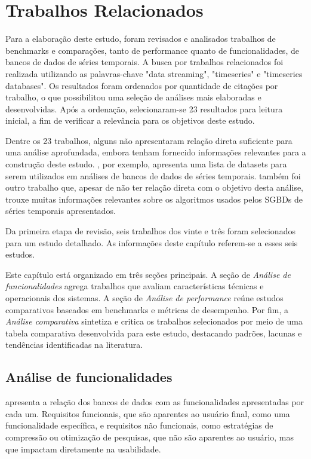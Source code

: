 \chapter{Trabalhos Relacionados}

Para a elaboração deste estudo, foram revisados e analisados trabalhos de benchmarks e comparações, tanto de performance quanto de funcionalidades, de bancos de dados de séries temporais. A busca por trabalhos relacionados foi realizada utilizando as palavras-chave "data streaming", "timeseries" e "timeseries databases". Os resultados foram ordenados por quantidade de citações por trabalho, o que possibilitou uma seleção de análises mais elaboradas e desenvolvidas. Após a ordenação, selecionaram-se 23 resultados para leitura inicial, a fim de verificar a relevância para os objetivos deste estudo.

Dentre os 23 trabalhos, alguns não apresentaram relação direta suficiente para uma análise aprofundada, embora tenham fornecido informações relevantes para a construção deste estudo. , por exemplo, apresenta uma lista de datasets para serem utilizados em análises de bancos de dados de séries temporais.  também foi outro trabalho que, apesar de não ter relação direta com o objetivo desta análise, trouxe muitas informações relevantes sobre os algoritmos usados pelos SGBDs de séries temporais apresentados.

Da primeira etapa de revisão, seis trabalhos dos vinte e três foram selecionados para um estudo detalhado. As informações deste capítulo referem-se a esses seis estudos.

Este capítulo está organizado em três seções principais. A seção de \textit{Análise de funcionalidades} agrega trabalhos que avaliam características técnicas e operacionais dos sistemas. A seção de \textit{Análise de performance} reúne estudos comparativos baseados em benchmarks e métricas de desempenho. Por fim, a \textit{Análise comparativa} sintetiza e critica os trabalhos selecionados por meio de uma tabela comparativa desenvolvida para este estudo, destacando padrões, lacunas e tendências identificadas na literatura.

\section{Análise de funcionalidades}

 apresenta a relação dos bancos de dados com as funcionalidades apresentadas por cada um. Requisitos funcionais, que são aparentes ao usuário final, como uma funcionalidade específica, e requisitos não funcionais, como estratégias de compressão ou otimização de pesquisas, que não são aparentes ao usuário, mas que impactam diretamente na usabilidade.

